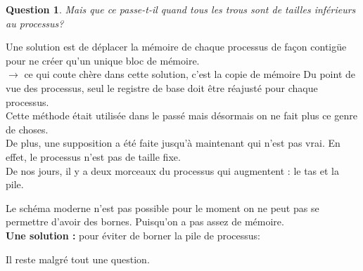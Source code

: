 \documentclass[12pt,a4paper]{report}
\newtheorem*{q}{Question}
\begin{document}
\begin{q}Mais que ce passe-t-il quand tous les trous sont de tailles inférieurs au processus?\end{q}
Une solution est de déplacer la mémoire de chaque processus de façon contigüe pour ne créer qu'un unique bloc de mémoire.\\
$\rightarrow$ ce qui coute chère dans cette solution, c'est la copie de mémoire  Du point de vue des processus, seul le registre de base doit être réajusté pour chaque processus.\\
Cette méthode était utilisée dans le passé mais désormais on
ne fait plus ce genre de choses.\\

De plus, une supposition a été faite jusqu'à maintenant qui n'est pas vrai. En effet, le processus n'est pas de taille fixe.\\
De nos jours, il y a deux morceaux du processus qui augmentent : le tas et la pile. \\

\begin{center}
\end{center}

Le schéma moderne n'est pas possible pour le moment on ne peut pas se permettre d'avoir des bornes. Puisqu'on a pas assez de mémoire.\\
\textbf{Une solution :} pour éviter de borner la pile de processus:

\begin{center}
\end{center}
Il reste malgré tout une question.\\
\end{document}
